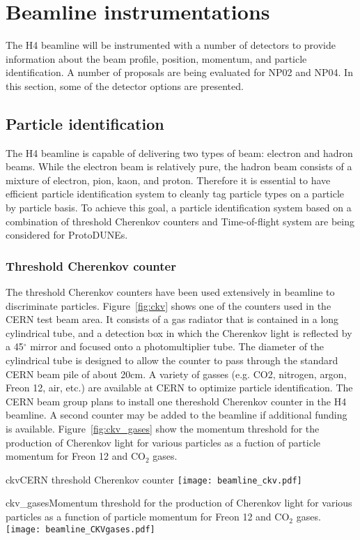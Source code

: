 \section{Beamline instrumentations}
\label{sec:beaminstruments}

The H4 beamline will be instrumented with a number of detectors to provide information about the beam profile, position, momentum, and particle identification. A number of proposals are being evaluated for NP02 and NP04. In this section, some of the detector options are presented.

\subsection{Particle identification}
The H4 beamline is capable of delivering two types of beam: electron and hadron beams. While the electron beam is relatively pure, the hadron beam consists of a mixture of electron, pion, kaon, and proton. Therefore it is essential to have efficient particle identification system to cleanly tag particle types on a particle by particle basis. To achieve this goal, a particle identification system based on a combination of threshold Cherenkov counters and Time-of-flight system are being considered for ProtoDUNEs.

\subsubsection{Threshold Cherenkov counter}
The threshold Cherenkov counters have been used extensively in beamline to discriminate particles. Figure~\ref{fig:ckv} shows one of the counters used in the CERN test beam area. It consists of a gas radiator that is contained in a long cylindrical tube, and a detection box in which the Cherenkov light is reflected by a 45$^\circ$ mirror and focused onto a photomultiplier tube. The diameter of the cylindrical tube is designed to allow the counter to pass through the standard CERN beam pile of about 20cm. A variety of gasses (e.g. CO2, nitrogen, argon, Freon 12, air, etc.) are available at CERN to optimize particle identification. The CERN beam group plans to install one thereshold Cherenkov counter in the H4 beamline. A second counter may be added to the beamline if additional funding is available. Figure~\ref{fig:ckv_gases} show the momentum threshold for the production of Cherenkov light for various particles as a fuction of particle momentum for Freon 12 and CO$_2$ gases.
\begin{cdrfigure}{ckv}{CERN threshold Cherenkov counter}
  \texttt{[image: beamline\_ckv.pdf]}
\end{cdrfigure}
\begin{cdrfigure}{ckv_gases}{Momentum threshold for the production of Cherenkov light for various particles as a function of particle momentum for Freon 12 and CO$_2$ gases.}
  \texttt{[image: beamline\_CKVgases.pdf]}
\end{cdrfigure}


